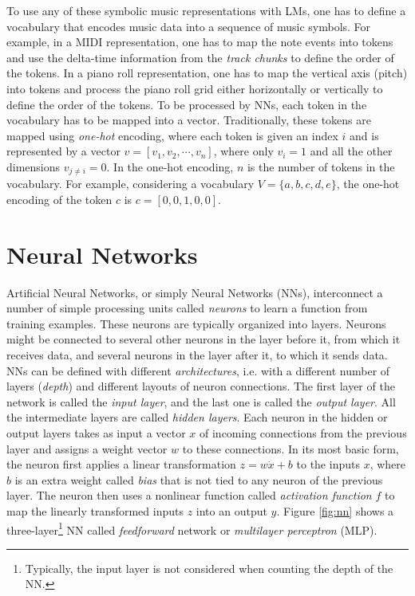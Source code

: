 To use any of these symbolic music representations with LMs, one has to define a vocabulary that encodes music data into a sequence of music symbols. %
For example, in a MIDI representation, one has to map the note events into tokens and use the delta-time information from the \textit{track chunks} to define the order of the tokens. In a piano roll representation, one has to map the vertical axis (pitch) into tokens and process the piano roll grid either horizontally or vertically to define the order of the tokens. To be processed by NNs, each token in the vocabulary has to be mapped into a vector. Traditionally, these tokens are mapped using \textit{one-hot} encoding, where each token is given an index $i$ and is represented by a vector $v = [v_1, v_2, \cdots, v_n]$, where only $v_i = 1$ and all the other dimensions $v_{j \neq i} = 0$. In the one-hot encoding, $n$ is the number of tokens in the vocabulary.
For example, considering a vocabulary $V = \{a, b, c, d, e\}$, the one-hot encoding of the token $c$ is $c = [0,0,1,0,0]$.

\section{Neural Networks}

Artificial Neural Networks, or simply Neural Networks (NNs), interconnect a number of simple processing units called \textit{neurons} to learn a function from training examples. These neurons are typically organized into layers. Neurons might be connected to several other neurons in the layer before it, from which it receives data, and several neurons in the layer after it, to which it sends data. NNs can be defined with different \textit{architectures}, i.e. with a different number of layers (\textit{depth}) and different layouts of neuron connections. The first layer of the network is called the \textit{input layer}, and the last one is called the \textit{output layer}. All the intermediate layers are called \textit{hidden layers}. Each neuron in the hidden or output layers takes as input a vector $x$ of incoming connections from the previous layer and assigns a weight vector $w$ to these connections. In its most basic form, the neuron first applies a linear transformation $z = w \dot x + b$ to the inputs $x$, where $b$ is an extra weight called \textit{bias} that is not tied to any neuron of the previous layer. The neuron then uses a nonlinear function called \textit{activation function} $f$ to map the linearly transformed inputs $z$ into an output $\hat{y}$. Figure \ref{fig:nn} shows a three-layer\footnote{Typically, the input layer is not considered when counting the depth of the NN.} NN called \textit{feedforward} network or \textit{multilayer perceptron} (MLP).

